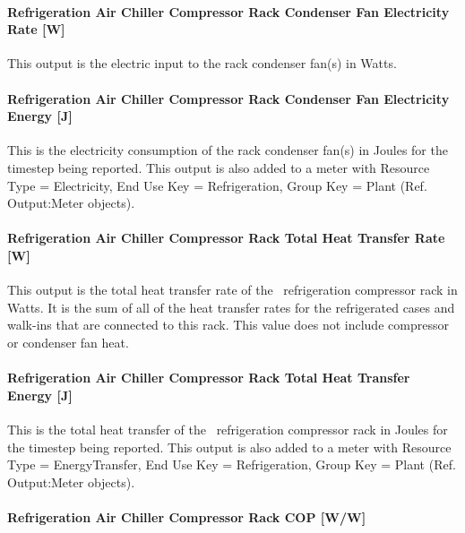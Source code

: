 \paragraph{Refrigeration Air Chiller Compressor Rack Condenser Fan Electricity Rate {[}W{]}}\label{refrigeration-air-chiller-compressor-rack-condenser-fan-electric-power-w}

This output is the electric input to the rack condenser fan(s) in Watts.

\paragraph{Refrigeration Air Chiller Compressor Rack Condenser Fan Electricity Energy {[}J{]}}\label{refrigeration-air-chiller-compressor-rack-condenser-fan-electric-energy-j}

This is the electricity consumption of the rack condenser fan(s) in Joules for the timestep being reported. This output is also added to a meter with Resource Type = Electricity, End Use Key = Refrigeration, Group Key = Plant (Ref. Output:Meter objects).

\paragraph{Refrigeration Air Chiller Compressor Rack Total Heat Transfer Rate {[}W{]}}\label{refrigeration-air-chiller-compressor-rack-total-heat-transfer-rate-w}

This output is the total heat transfer rate of the ~refrigeration compressor rack in Watts. It is the sum of all of the heat transfer rates for the refrigerated cases and walk-ins that are connected to this rack. This value does not include compressor or condenser fan heat.

\paragraph{Refrigeration Air Chiller Compressor Rack Total Heat Transfer Energy {[}J{]}}\label{refrigeration-air-chiller-compressor-rack-total-heat-transfer-energy-j}

This is the total heat transfer of the~ refrigeration compressor rack in Joules for the timestep being reported. This output is also added to a meter with Resource Type = EnergyTransfer, End Use Key = Refrigeration, Group Key = Plant (Ref. Output:Meter objects).

\paragraph{Refrigeration Air Chiller Compressor Rack COP {[}W/W{]}}\label{refrigeration-air-chiller-compressor-rack-cop-ww}

